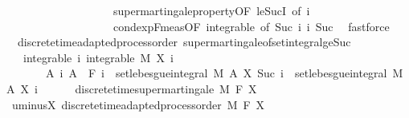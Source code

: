 \begin{isabellebody}
\ \ \ \ \ \ \ \ \ \ \ \ \ \ \ \ \ \ \ supermartingale{\isacharunderscore}{\kern0pt}property{\isacharbrackleft}{\kern0pt}OF\ le{\isacharunderscore}{\kern0pt}SucI{\isacharcomma}{\kern0pt}\ of\ i{\isacharbrackright}{\kern0pt}\isanewline
\ \ \ \ \ \ \ \ \ \ \ \ \ \ \ \ \ \ \ cond{\isacharunderscore}{\kern0pt}exp{\isacharunderscore}{\kern0pt}F{\isacharunderscore}{\kern0pt}meas{\isacharbrackleft}{\kern0pt}OF\ integrable{\isacharcomma}{\kern0pt}\ of\ {\isachardoublequoteopen}Suc\ i{\isachardoublequoteclose}\ i{\isacharbrackright}{\kern0pt}\ Suc\ \isamarkupfalse%
\ fastforce\isanewline
{}\isamarkupfalse%
%
\endisatagproof
{\isafoldproof}%
%
\isadelimproof
\isanewline
%
\endisadelimproof
\isanewline
{}\isamarkupfalse%
\ {\isacharparenleft}{\kern0pt}\ discrete{\isacharunderscore}{\kern0pt}time{\isacharunderscore}{\kern0pt}adapted{\isacharunderscore}{\kern0pt}process{\isacharunderscore}{\kern0pt}order{\isacharparenright}{\kern0pt}\ supermartingale{\isacharunderscore}{\kern0pt}of{\isacharunderscore}{\kern0pt}set{\isacharunderscore}{\kern0pt}integral{\isacharunderscore}{\kern0pt}ge{\isacharunderscore}{\kern0pt}Suc{\isacharcolon}{\kern0pt}\isanewline
\ \ \ integrable{\isacharcolon}{\kern0pt}\ {\isachardoublequoteopen}{\isasymAnd}i{\isachardot}{\kern0pt}\ integrable\ M\ {\isacharparenleft}{\kern0pt}X\ i{\isacharparenright}{\kern0pt}{\isachardoublequoteclose}\ \isanewline
\ \ \ \ \ \ \ {\isachardoublequoteopen}{\isasymAnd}A\ i{\isachardot}{\kern0pt}\ A\ {\isasymin}\ F\ i\ {\isasymLongrightarrow}\ set{\isacharunderscore}{\kern0pt}lebesgue{\isacharunderscore}{\kern0pt}integral\ M\ A\ {\isacharparenleft}{\kern0pt}X\ {\isacharparenleft}{\kern0pt}Suc\ i{\isacharparenright}{\kern0pt}{\isacharparenright}{\kern0pt}\ {\isasymle}\ set{\isacharunderscore}{\kern0pt}lebesgue{\isacharunderscore}{\kern0pt}integral\ M\ A\ {\isacharparenleft}{\kern0pt}X\ i{\isacharparenright}{\kern0pt}{\isachardoublequoteclose}\ \isanewline
\ \ \ \ \ {\isachardoublequoteopen}discrete{\isacharunderscore}{\kern0pt}time{\isacharunderscore}{\kern0pt}supermartingale\ M\ F\ X{\isachardoublequoteclose}\isanewline
%
\isadelimproof
%
\endisadelimproof
%
\isatagproof
{}\isamarkupfalse%
\ {\isacharminus}{\kern0pt}\isanewline
\ \ \isamarkupfalse%
\ uminus{\isacharunderscore}{\kern0pt}X{\isacharcolon}{\kern0pt}\ discrete{\isacharunderscore}{\kern0pt}time{\isacharunderscore}{\kern0pt}adapted{\isacharunderscore}{\kern0pt}process{\isacharunderscore}{\kern0pt}order\ M\ F\ {\isachardoublequoteopen}{\isacharminus}{\kern0pt}X{\isachardoublequoteclose}\ \isamarkupfalse%

\end{isabellebody}
